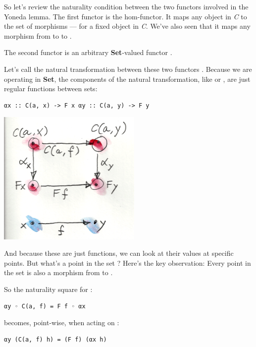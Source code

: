 So let's review the naturality condition between the two functors
involved in the Yoneda lemma. The first functor is the hom-functor. It
maps any object  in \emph{C} to the set of morphisms
 --- for  a fixed object in \emph{C}. We've
also seen that it maps any morphism  from  to
 to .

The second functor is an arbitrary \textbf{Set}-valued functor
.

Let's call the natural transformation between these two functors
. Because we are operating in \textbf{Set}, the components of
the natural transformation, like  or , are just
regular functions between sets:

\begin{Verbatim}[commandchars=\\\{\}]
αx :: C(a, x) -> F x αy :: C(a, y) -> F y
\end{Verbatim}

\includegraphics[width=2.73958in]{images/yoneda1.png}

And because these are just functions, we can look at their values at
specific points. But what's a point in the set ? Here's
the key observation: Every point in the set  is also a
morphism  from  to .

So the naturality square for :

\begin{Verbatim}[commandchars=\\\{\}]
αy ◦ C(a, f) = F f ◦ αx
\end{Verbatim}

becomes, point-wise, when acting on :

\begin{Verbatim}[commandchars=\\\{\}]
αy (C(a, f) h) = (F f) (αx h)
\end{Verbatim}

